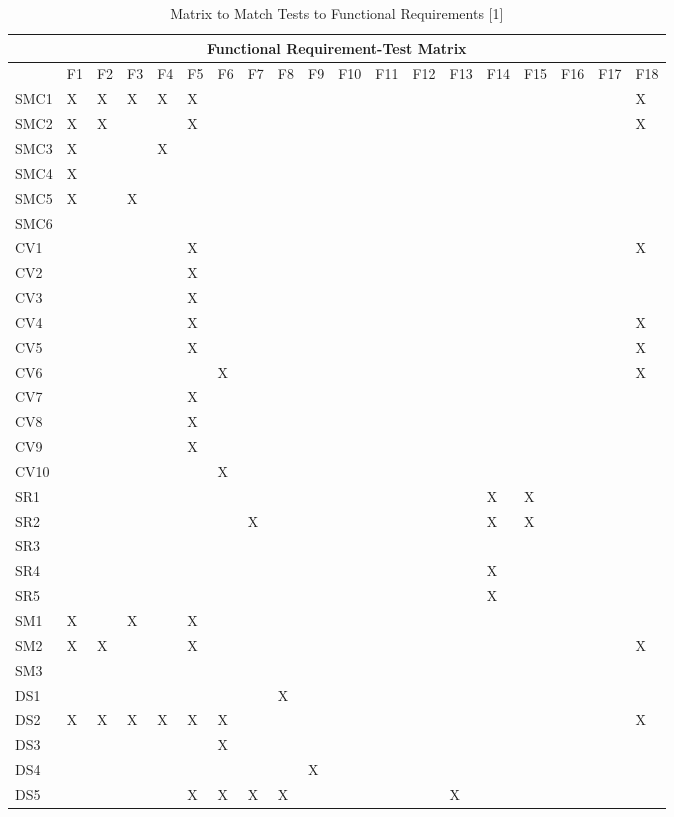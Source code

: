 \documentclass[11pt]{article}
\begin{document}
\begin{table}[H]
\centering
\caption{Matrix to Match Tests to Functional Requirements [1]}
\label{my-label}
\begin{tabular}{| l | l | l | l | l | l | l | l | l | l | l | l | l | l | l | l | l | l | l |}
\hline
\multicolumn{19}{|c|}{\textbf{Functional Requirement-Test Matrix}}                          \\ \hline
 & \tiny{F1} & \tiny{F2} & \tiny{F3} & \tiny{F4} & \tiny{F5} & \tiny{F6} & \tiny{F7} & \tiny{F8} & \tiny{F9} & \tiny{F10} & \tiny{F11} & \tiny{F12} & \tiny{F13} & \tiny{F14} & \tiny{F15} & \tiny{F16} & \tiny{F17} & \tiny{F18} \\ \hline
SMC1&X&X&X&X&X&&&&&&&&&&&&&X \\ \hline
SMC2&X&X&&&X&&&&&&&&&&&&&X \\ \hline
SMC3&X&&&X&&&&&&&&&&&&&& \\ \hline
SMC4&X&&&&&&&&&&&&&&&&& \\ \hline
SMC5&X&&X&&&&&&&&&&&&&&& \\ \hline
SMC6&&&&&&&&&&&&&&&&&& \\ \hline
CV1&&&&&X&&&&&&&&&&&&&X \\ \hline
CV2&&&&&X&&&&&&&&&&&&& \\ \hline
CV3&&&&&X&&&&&&&&&&&&& \\ \hline
CV4&&&&&X&&&&&&&&&&&&&X \\ \hline
CV5&&&&&X&&&&&&&&&&&&&X \\ \hline
CV6&&&&&&X&&&&&&&&&&&&X \\ \hline
CV7&&&&&X&&&&&&&&&&&&& \\ \hline
CV8&&&&&X&&&&&&&&&&&&& \\ \hline
CV9&&&&&X&&&&&&&&&&&&& \\ \hline
CV10&&&&&&X&&&&&&&&&&&& \\ \hline
SR1&&&&&&&&&&&&&&X&X&&& \\ \hline
SR2&&&&&&&X&&&&&&&X&X&&& \\ \hline
SR3&&&&&&&&&&&&&&&&&& \\ \hline
SR4&&&&&&&&&&&&&&X&&&& \\ \hline
SR5&&&&&&&&&&&&&&X&&&& \\ \hline
SM1&X&&X&&X&&&&&&&&&&&&& \\ \hline
SM2&X&X&&&X&&&&&&&&&&&&&X \\ \hline
SM3&&&&&&&&&&&&&&&&&& \\ \hline
DS1&&&&&&&&X&&&&&&&&&& \\ \hline
DS2&X&X&X&X&X&X&&&&&&&&&&&&X \\ \hline
DS3&&&&&&X&&&&&&&&&&&& \\ \hline
DS4&&&&&&&&&X&&&&&&&&& \\ \hline
DS5&&&&&X&X&X&X&&&&&X&&&&& \\ \hline
\end{tabular}
\end{table}
\end{document}
